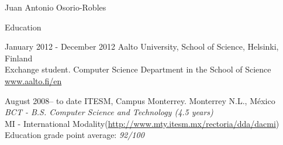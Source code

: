 \documentclass[spanish,10pt,letterpaper]{article}
\begin{document}
\begin{cv}{Juan Antonio Osorio-Robles}
	\begin{cvlist}{Education}
		\item [January 2012 - December 2012]
			Aalto University, School of Science, Helsinki, Finland
			\\
			Exchange student. Computer Science Department in the School of Science
			\\
			\href{www.aalto.fi/en}{www.aalto.fi/en}

		\item	[August 2008-- to date]
			ITESM, Campus Monterrey. Monterrey N.L., M\'{e}xico
			\\
			\emph{BCT - B.S. Computer Science and Technology (4.5 years)}
			\\
			MI - International Modality(\href{http://www.mty.itesm.mx/rectoria/dda/dacmi}{http://www.mty.itesm.mx/rectoria/dda/dacmi})
			\\
			Education grade point average: \emph{92/100}
	\end{cvlist}


\end{cv}
\end{document}
